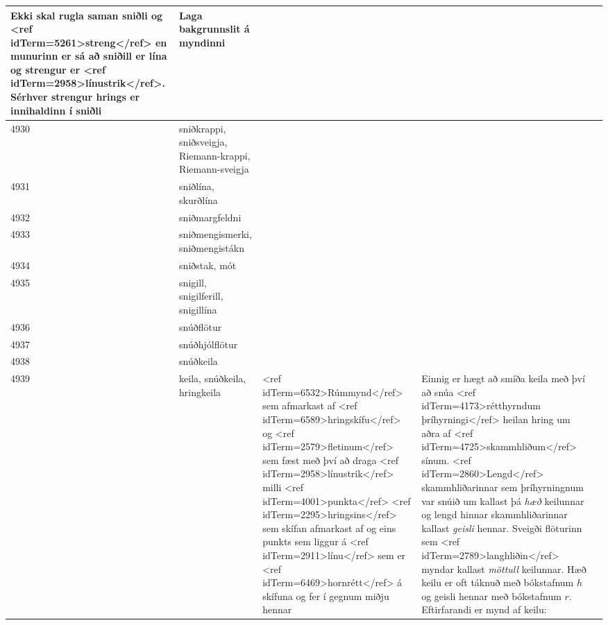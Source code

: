 \begin{longtable}{p{}|p{}|p{}|p{}|p{}}
Ekki skal rugla saman sniðli og <ref idTerm=5261>streng</ref> en munurinn er sá að sniðill er lína og strengur er <ref idTerm=2958>línustrik</ref>. Sérhver strengur hrings er innihaldinn í sniðli & Laga bakgrunnslit á myndinni \\
\hline
4930 & sniðkrappi, sniðsveigja, Riemann-krappi, Riemann-sveigja &  &  &  \\
\hline
4931 & sniðlína, skurðlína &  &  &  \\
\hline
4932 & sniðmargfeldni &  &  &  \\
\hline
4933 & sniðmengismerki, sniðmengistákn &  &  &  \\
\hline
4934 & sniðstak, mót &  &  &  \\
\hline
4935 & snigill, snigilferill, snigillína &  &  &  \\
\hline
4936 & snúðflötur &  &  &  \\
\hline
4937 & snúðhjólflötur &  &  &  \\
\hline
4938 & snúðkeila &  &  &  \\
\hline
4939 & keila, snúðkeila, hringkeila & <ref idTerm=6532>Rúmmynd</ref> sem afmarkast af <ref idTerm=6589>hringskífu</ref> og <ref idTerm=2579>fletinum</ref> sem fæst með því að draga <ref idTerm=2958>línustrik</ref> milli <ref idTerm=4001>punkta</ref> <ref idTerm=2295>hringsins</ref> sem skífan afmarkast af og eins punkts sem liggur á <ref idTerm=2911>línu</ref> sem er <ref idTerm=6469>hornrétt</ref> á skífuna og fer í gegnum miðju hennar & Einnig er hægt að smíða keila með því að snúa <ref idTerm=4173>rétthyrndum þríhyrningi</ref> heilan hring um aðra af <ref idTerm=4725>skammhliðum</ref> sínum. <ref idTerm=2860>Lengd</ref> skammhliðarinnar sem þríhyrningnum var snúið um kallast þá \textit{hæð} keilunnar og lengd hinnar skammhliðarinnar kallast \textit{geisli} hennar. Sveigði flöturinn sem <ref idTerm=2789>langhliðin</ref> myndar kallast \textit{möttull} keilunnar. Hæð keilu er oft táknuð með bókstafnum $h$ og geisli hennar með bókstafnum $r$. Eftirfarandi er mynd af keilu:


\end{longtable}
